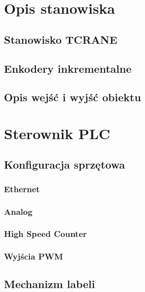 \documentclass{mwrep}
\begin{document}
\tableofcontents


\chapter{Opis stanowiska}
\label{Opis}

\section{Stanowisko TCRANE}
\label{Opis::TCRANE}

\section{Enkodery inkrementalne}
\label{Opis::Enkodery}

\section{Opis wejść i wyjść obiektu}
\label{Opis::IO}


\chapter{Sterownik PLC}
\label{PLC}

\section{Konfiguracja sprzętowa}
\label{PLC::Konfiguracja}

\subsection{Ethernet}
\label{PLC::Konfiguracja::Ethernet}

\subsection{Analog}
\label{PLC::Konfiguracja::Analog}

\subsection{High Speed Counter}
\label{PLC::Konfiguracja::HIOEN}

\subsection{Wyjścia PWM}
\label{PLC::Konfiguracja::PWM}

\section{Mechanizm labeli}
\label{PLC::Labels}
\end{document}

